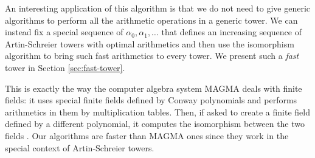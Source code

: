 An interesting application of this algorithm is that we do not need to
give generic algorithms to perform all the arithmetic operations in a
generic tower. We can instead fix a special sequence of
$\alpha_0,\alpha_1,\ldots$ that defines an increasing sequence of
Artin-Schreier towers with optimal arithmetics and then use the
isomorphism algorithm to bring such fast arithmetics to every
tower. We present such a \emph{fast} tower in Section
\ref{sec:fast-tower}.

This is exactly the way the computer algebra system MAGMA deals with
finite fields: it uses special finite fields defined by Conway
polynomials and performs arithmetics in them by multiplication tables.
Then, if asked to create a finite field defined by a different
polynomial, it computes the isomorphism between the two fields
\cite{}. Our algorithms are faster than MAGMA ones since they work in
the special context of Artin-Schreier towers.

%

